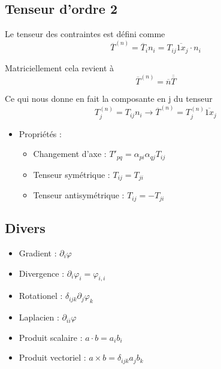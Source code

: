 \subsection*{Tenseur d'ordre 2}
\begin{multicols}{2}
	\noindent Le tenseur des contraintes est défini comme
	\begin{equation}
		\overline{T}^{(n)} = \overline{T}_i n_i = T_{ij} \overline{1x}_j \cdot n_i
	\end{equation}
	
	Matriciellement cela revient à
	\begin{equation}
		\overline{T}^{(n)} = \overline{n}\overline{\overline{T}}
	\end{equation}
\end{multicols}
Ce qui nous donne en fait la composante en j du tenseur 
\begin{equation}
	T_j^{(n)} = T_{ij} n_i \rightarrow \overline{T}^{(n)}= T_j^{(n)} \overline{1x}_j  
\end{equation}


\begin{itemize}
	\item Propriétés : 
	      \begin{itemize}
	      	\item Changement d'axe : $T'_{pq} = \alpha _{pi} \alpha _{qj} T_{ij}$ 
	      	\item Tenseur symétrique : $T_{ij} = T_{ji}$
	      	\item Tenseur antisymétrique : $T_{ij} = - T_{ji}$		
	      \end{itemize}
\end{itemize}

\subsection*{Divers}
\begin{multicols}{2}
	\begin{itemize}
		\item Gradient : $\partial _i \varphi$
		\item Divergence : $\partial _i \varphi _i = \varphi _{i,i}$
		\item Rotationel : $\delta _{ijk} \partial _j \varphi _k$
		\item Laplacien : $\partial _{ii} \varphi$
		\item Produit scalaire : $a \cdot b = a_i b_i$
		\item Produit vectoriel : $a \times b = \delta _{ijk} a_j b_k$
	\end{itemize}
\end{multicols}